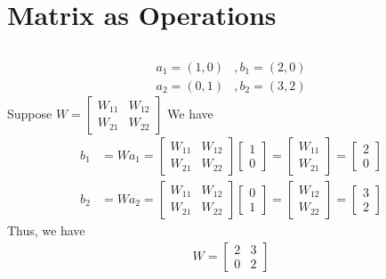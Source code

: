 \documentclass{article}
\begin{document}
\section{Matrix as Operations}\label{sec:Matrix as Operations} %
\subsection{} %
\begin{align*}
    a_1 = (1, 0)&, b_1 = (2, 0)\\
    a_2 = (0, 1)&, b_2 = (3, 2)
\end{align*}
Suppose $ W = \begin{bmatrix}
    W_{11} & W_{12} \\ W_{21} & W_{22}
\end{bmatrix} $
We have
\begin{align*}
    b_1 &= Wa_1 = \begin{bmatrix}
        W_{11} & W_{12} \\ W_{21} & W_{22}
    \end{bmatrix}\begin{bmatrix}
    1 \\ 0 
    \end{bmatrix}=\begin{bmatrix}
    W_{11} \\ W_{21}
    \end{bmatrix} = \begin{bmatrix}
    2\\0
    \end{bmatrix}\\
    b_2 &= Wa_2 = \begin{bmatrix}
        W_{11 } & W_{12 } \\
        W_{21 } & W_{22}
    \end{bmatrix}\begin{bmatrix}
    0 \\1 
    \end{bmatrix} = \begin{bmatrix}
        W_{12} \\
        W_{22}
    \end{bmatrix} = \begin{bmatrix}
    3  \\ 2 
    \end{bmatrix}
\end{align*}
Thus, we have
\begin{align*}
    W = \begin{bmatrix}
    2 & 3 \\
    0 & 2
    \end{bmatrix}
\end{align*}
\end{document}

